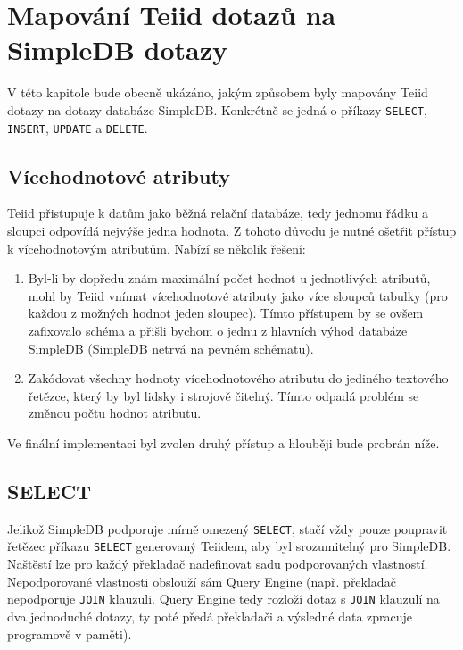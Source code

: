 \documentclass[oneside,11pt]{fithesis2}
\begin{document}
\chapter{Mapování Teiid dotazů na SimpleDB dotazy}
V této kapitole bude obecně ukázáno, jakým způsobem byly mapovány Teiid dotazy na dotazy databáze SimpleDB. Konkrétně se jedná o příkazy \verb<SELECT<, \verb<INSERT<, \verb<UPDATE< a \verb<DELETE<.
\section{Vícehodnotové atributy}
Teiid přistupuje k datům jako běžná relační databáze, tedy jednomu řádku a sloupci odpovídá nejvýše jedna hodnota. Z tohoto důvodu je nutné ošetřit přístup k vícehodnotovým atributům. Nabízí se několik řešení:
\begin{enumerate}
 \item Byl-li by dopředu znám maximální počet hodnot u jednotlivých atributů, mohl by Teiid vnímat vícehodnotové atributy jako více sloupců tabulky (pro každou z možných hodnot jeden sloupec). Tímto přístupem by se ovšem zafixovalo schéma a přišli bychom o jednu z hlavních výhod databáze SimpleDB (SimpleDB netrvá na pevném schématu).
 \item Zakódovat všechny hodnoty vícehodnotového atributu do jediného textového řetězce, který by byl lidsky i strojově čitelný. Tímto odpadá problém se změnou počtu hodnot atributu.
\end{enumerate}
Ve finální implementaci byl zvolen druhý přístup a hlouběji bude probrán níže.

\section{SELECT}
Jelikož SimpleDB podporuje mírně omezený \verb|SELECT|, stačí vždy pouze poupravit řetězec příkazu \verb|SELECT| generovaný Teiidem, aby byl srozumitelný pro SimpleDB. Naštěstí lze pro každý překladač nadefinovat sadu podporovaných vlastností. Nepodporované vlastnosti obslouží sám Query Engine (např. překladač nepodporuje \verb<JOIN< klauzuli. Query Engine tedy rozloží dotaz s \verb<JOIN< klauzulí na dva jednoduché dotazy, ty poté předá překladači a výsledné data zpracuje programově v paměti).
\end{document}
